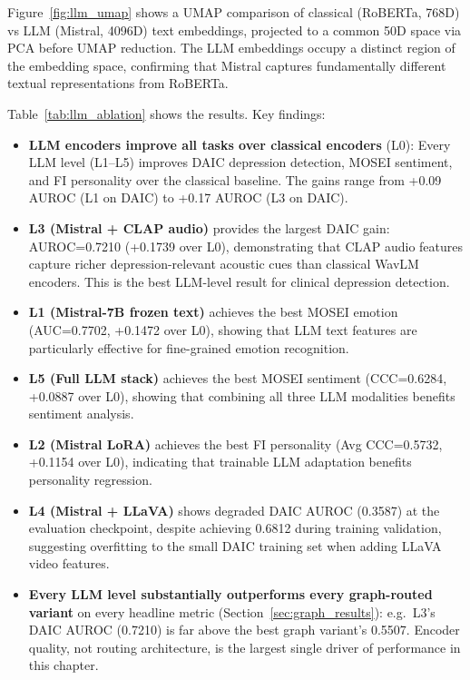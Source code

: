 \documentclass[12pt,oneside]{book}
\begin{document}
Figure~\ref{fig:llm_umap} shows a UMAP comparison of classical (RoBERTa, 768D) vs LLM (Mistral, 4096D) text embeddings, projected to a common 50D space via PCA before UMAP reduction. The LLM embeddings occupy a distinct region of the embedding space, confirming that Mistral captures fundamentally different textual representations from RoBERTa.

Table~\ref{tab:llm_ablation} shows the results. Key findings:

\begin{itemize}
    \item \textbf{LLM encoders improve all tasks over classical encoders} (L0): Every LLM level (L1--L5) improves DAIC depression detection, MOSEI sentiment, and FI personality over the classical baseline. The gains range from +0.09 AUROC (L1 on DAIC) to +0.17 AUROC (L3 on DAIC).
    \item \textbf{L3 (Mistral + CLAP audio)} provides the largest DAIC gain: AUROC=0.7210 (+0.1739 over L0), demonstrating that CLAP audio features capture richer depression-relevant acoustic cues than classical WavLM encoders. This is the best LLM-level result for clinical depression detection.
    \item \textbf{L1 (Mistral-7B frozen text)} achieves the best MOSEI emotion (AUC=0.7702, +0.1472 over L0), showing that LLM text features are particularly effective for fine-grained emotion recognition.
    \item \textbf{L5 (Full LLM stack)} achieves the best MOSEI sentiment (CCC=0.6284, +0.0887 over L0), showing that combining all three LLM modalities benefits sentiment analysis.
    \item \textbf{L2 (Mistral LoRA)} achieves the best FI personality (Avg CCC=0.5732, +0.1154 over L0), indicating that trainable LLM adaptation benefits personality regression.
    \item \textbf{L4 (Mistral + LLaVA)} shows degraded DAIC AUROC (0.3587) at the evaluation checkpoint, despite achieving 0.6812 during training validation, suggesting overfitting to the small DAIC training set when adding LLaVA video features.
    \item \textbf{Every LLM level substantially outperforms every graph-routed variant} on every headline metric (Section~\ref{sec:graph_results}): e.g.\ L3's DAIC AUROC (0.7210) is far above the best graph variant's 0.5507. Encoder quality, not routing architecture, is the largest single driver of performance in this chapter.
\end{itemize}
\end{document}
